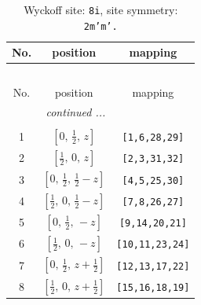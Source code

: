 \documentclass[fleqn,8pt]{jsarticle}
\begin{document}
\renewcommand{\arraystretch}{1.2}
\begin{longtable}{ccc}
\caption{Wyckoff site: {\tt 8i}, site symmetry: {\tt 2m'm'.}}
 \\
 \hline \hline
No. & position & mapping \\ \hline \endfirsthead

\multicolumn{2}{l}{\tablename\ \thetable{}} \\
 \hline \hline
No. & position & mapping \\ \hline \endhead

 \hline \hline
\multicolumn{2}{r}{\footnotesize\it continued ...} \\ \endfoot

 \hline \hline
\multicolumn{2}{r}{} \\ \endlastfoot

1 & $\left[ 0,\, \frac{1}{2},\, z \right]$ & {\tt [1,6,28,29]} \\ \hline
2 & $\left[ \frac{1}{2},\, 0,\, z \right]$ & {\tt [2,3,31,32]} \\ \hline
3 & $\left[ 0,\, \frac{1}{2},\, \frac{1}{2} - z \right]$ & {\tt [4,5,25,30]} \\ \hline
4 & $\left[ \frac{1}{2},\, 0,\, \frac{1}{2} - z \right]$ & {\tt [7,8,26,27]} \\ \hline
5 & $\left[ 0,\, \frac{1}{2},\, - z \right]$ & {\tt [9,14,20,21]} \\ \hline
6 & $\left[ \frac{1}{2},\, 0,\, - z \right]$ & {\tt [10,11,23,24]} \\ \hline
7 & $\left[ 0,\, \frac{1}{2},\, z + \frac{1}{2} \right]$ & {\tt [12,13,17,22]} \\ \hline
8 & $\left[ \frac{1}{2},\, 0,\, z + \frac{1}{2} \right]$ & {\tt [15,16,18,19]} \\
\end{longtable}
\renewcommand{\arraystretch}{1.2}
\end{document}
